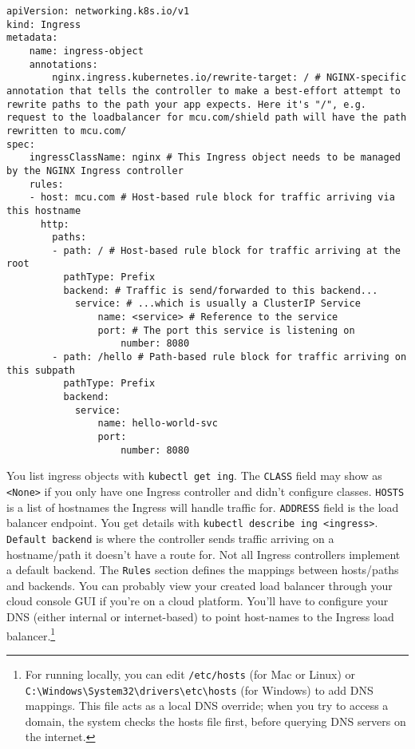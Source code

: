 \documentclass[8pt, table, xcdraw]{article}%
\begin{document}
\begin{lstlisting}
apiVersion: networking.k8s.io/v1
kind: Ingress
metadata:
    name: ingress-object
    annotations:
        nginx.ingress.kubernetes.io/rewrite-target: / # NGINX-specific annotation that tells the controller to make a best-effort attempt to rewrite paths to the path your app expects. Here it's "/", e.g. request to the loadbalancer for mcu.com/shield path will have the path rewritten to mcu.com/
spec:
    ingressClassName: nginx # This Ingress object needs to be managed by the NGINX Ingress controller 
    rules:
    - host: mcu.com # Host-based rule block for traffic arriving via this hostname
      http:
        paths:
        - path: / # Host-based rule block for traffic arriving at the root
          pathType: Prefix
          backend: # Traffic is send/forwarded to this backend...
            service: # ...which is usually a ClusterIP Service
                name: <service> # Reference to the service
                port: # The port this service is listening on
                    number: 8080
        - path: /hello # Path-based rule block for traffic arriving on this subpath
          pathType: Prefix
          backend:
            service:
                name: hello-world-svc
                port:
                    number: 8080
\end{lstlisting}

You list ingress objects with \lstinline{kubectl get ing}. The \lstinline{CLASS} field may show as \lstinline{<None>} if you only have one Ingress controller and didn’t configure classes. \lstinline{HOSTS} is a list of hostnames the Ingress will handle traffic for. \lstinline{ADDRESS} field is the load balancer endpoint. You get details with \lstinline{kubectl describe ing <ingress>}. \lstinline{Default backend} is where the controller sends traffic arriving on a hostname/path it doesn’t have a route for. Not all Ingress controllers implement a default backend. The \lstinline{Rules} section defines the mappings between hosts/paths and backends. You can probably view your created load balancer through your cloud console GUI if you’re on a cloud platform. You’ll have to configure your DNS (either internal or internet-based) to point host-names to the Ingress load balancer.\footnote{For running locally, you can edit \lstinline{/etc/hosts} (for Mac or Linux) or \lstinline{C:\Windows\System32\drivers\etc\hosts} (for Windows) to add DNS mappings. This file acts as a local DNS override; when you try to access a domain, the system checks the hosts file first, before querying DNS servers on the internet.}
\end{document}
